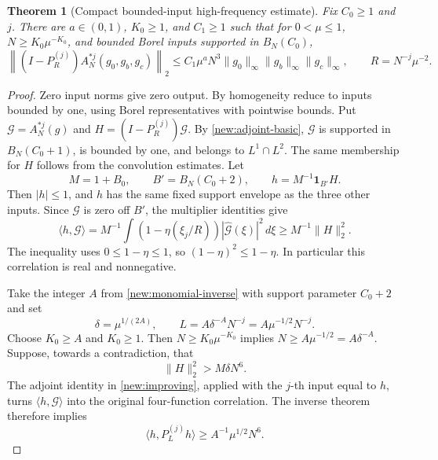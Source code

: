 \documentclass[11pt]{article}
\newtheorem{theorem}{Theorem}[section]
\theoremstyle{definition}
\newcommand{\one}{\mathbf 1}
\begin{document}
\begin{theorem}[Compact bounded-input high-frequency estimate]\label{new:compact-highpass}
Fix $C_0\geq1$ and $j$. There are $a\in(0,1)$, $K_0\geq1$, and $C_1\geq1$ such that
for $0<\mu\leq1$, $N\geq K_0\mu^{-K_0}$, and bounded Borel inputs supported in $B_N(C_0)$,
\[
 \left\|(I-P_R^{(j)})A_N^{*j}(g_0,g_b,g_c)\right\|_2
 \leq C_1\mu^a N^3\|g_0\|_\infty\|g_b\|_\infty\|g_c\|_\infty,
 \qquad R=N^{-j}\mu^{-2}.
\]
\end{theorem}
\begin{proof}
Zero input norms give zero output. By homogeneity reduce to inputs bounded by one, using
Borel representatives with pointwise bounds. Put $\mathcal G=A_N^{*j}(g)$ and
$H=(I-P_R^{(j)})\mathcal G$. By \cref{new:adjoint-basic}, $\mathcal G$ is supported in
$B_N(C_0+1)$, is bounded by one, and belongs to $L^1\cap L^2$. The same membership for
$H$ follows from the convolution estimates. Let
\[
 M=1+B_0,\qquad B'=B_N(C_0+2),\qquad h=M^{-1}\one_{B'}H.
\]
Then $|h|\leq1$, and $h$ has the same fixed support envelope as the three other inputs.
Since $\mathcal G$ is zero off $B'$, the multiplier identities give
\[
 \langle h,\mathcal G\rangle
 =M^{-1}\int(1-\eta(\xi_j/R))|\widehat{\mathcal G}(\xi)|^2\,d\xi
 \geq M^{-1}\|H\|_2^2.
\]
The inequality uses $0\leq1-\eta\leq1$, so $(1-\eta)^2\leq1-\eta$. In particular this
correlation is real and nonnegative.

Take the integer $A$ from \cref{new:monomial-inverse} with support parameter $C_0+2$ and set
\[
 \delta=\mu^{1/(2A)},\qquad L=A\delta^{-A}N^{-j}=A\mu^{-1/2}N^{-j}.
\]
Choose $K_0\geq A$ and $K_0\geq1$. Then $N\geq K_0\mu^{-K_0}$ implies
$N\geq A\mu^{-1/2}=A\delta^{-A}$. Suppose, towards a contradiction, that
\[
 \|H\|_2^2>M\delta N^6.
\]
The adjoint identity in \cref{new:improving}, applied with the $j$-th input equal to $h$,
turns $\langle h,\mathcal G\rangle$ into the original four-function correlation.
The inverse theorem therefore implies
\[
 \langle h,P_L^{(j)}h\rangle\geq A^{-1}\mu^{1/2}N^6.
\]


\end{proof}
\end{document}
